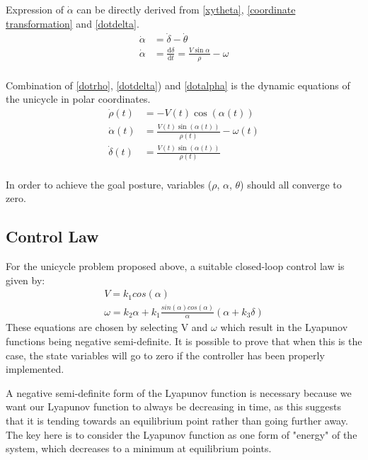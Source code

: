﻿\documentclass[twoside]{article}
\begin{document}
Expression of $\dot{\alpha}$ can be directly derived from \eqref{xytheta}, \eqref{coordinate transformation} and \eqref{dotdelta}.
\begin{equation} \label{dotalpha}
\begin{split}
\dot{\alpha} &= \dot{\delta} - \dot{\theta} \\
\dot{\alpha} &=  \frac{\mathrm{d}\delta}{\mathrm{d}t}=\frac{V \sin\alpha}{\rho} - \omega \\
\end{split}
\end{equation}

Combination of \eqref{dotrho}, \eqref{dotdelta}) and \eqref{dotalpha} is the dynamic equations of the unicycle in polar coordinates.
\begin{equation} \label{dotRhoDeltaAlpha}
\begin{split}
\dot{\rho}(t) &= -V(t) \cos(\alpha(t)) \\
\dot{\alpha}(t) &= \frac{V(t) \sin(\alpha(t))}{\rho(t)} - \omega(t) \\
\dot{\delta}(t) &= \frac{V(t) \sin(\alpha(t))}{\rho(t)}  \\
\end{split}
\end{equation}

In order to achieve the goal posture, variables ($\rho$, $\alpha$, $\theta$) should all converge to zero.

\pagebreak
\subsection{Control Law}

For the unicycle problem proposed above, a suitable closed-loop control law is given by:
\begin{equation}
\begin{split}
V=k_1 cos(\alpha)
\\
\omega=k_2 \alpha + k_1 \frac{sin(\alpha)cos(\alpha)}{\alpha}(\alpha + k_3 \delta)
\end{split}
\end{equation}
These equations are chosen by selecting V and $\omega$ which result in the Lyapunov functions being negative semi-definite. It is possible to prove that when this is the case, the state variables will go to zero if the controller has been properly implemented.

A negative semi-definite form of the Lyapunov function is necessary because we want our Lyapunov function to always be decreasing in time, as this suggests that it is tending towards an equilibrium point rather than going further away. The key here is to consider the Lyapunov function as one form of "energy" of the system, which decreases to a minimum at equilibrium points.
\end{document}
